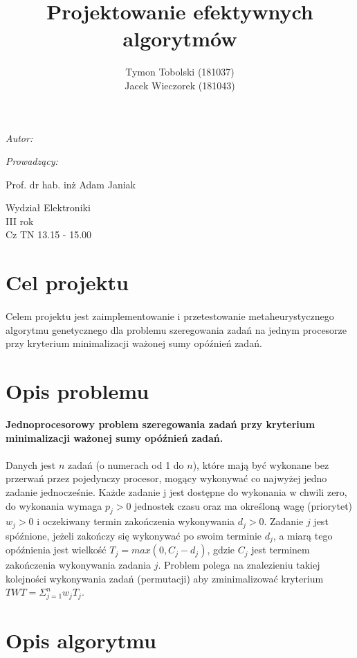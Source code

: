 \documentclass[wide,a4paper,titlepage,12pt] {article}
\title{Projektowanie efektywnych algorytmów}
\author{Tymon Tobolski (181037)\\ Jacek Wieczorek (181043)}
\makeatletter
\renewcommand{\maketitle}{
\begin{titlepage}
  \begin{center}
    \vspace*{3cm}
    \LARGE \@title \par
    \vspace{2cm}
    \textit{\small Autor:}\par
    \normalsize \@author\par \normalsize
    \vspace{3cm}
    \textit{\small Prowadzący:}\par
   Prof. dr hab. inż Adam Janiak \par
    \vspace{2cm}
    Wydział Elektroniki\\ III rok\\ Cz TN 13.15 - 15.00\par
    \vspace{4cm}
    \small \@date
  \end{center}
\end{titlepage}
}
\makeatother
\begin{document}
\maketitle

\section{Cel projektu}
\paragraph{}
  Celem projektu jest zaimplementowanie i przetestowanie metaheurystycznego algorytmu genetycznego dla problemu szeregowania zadań na jednym procesorze przy kryterium minimalizacji ważonej sumy opóźnień zadań.

\section{Opis problemu}
{\bf Jednoprocesorowy problem szeregowania zadań przy kryterium
minimalizacji ważonej sumy opóźnień zadań.}

\paragraph{}
Danych jest $n$ zadań (o numerach od 1 do $n$), które mają być wykonane bez przerwań przez pojedynczy procesor, mogący wykonywać co najwyżej jedno zadanie jednocześnie.
Każde zadanie j jest dostępne do wykonania w chwili zero, do wykonania wymaga $p_{j} > 0$ jednostek czasu oraz ma określoną wagę (priorytet) $w_{j} > 0$ i oczekiwany termin zakończenia
wykonywania $d_{j} > 0$. Zadanie $j$ jest spóźnione, jeżeli zakończy się wykonywać po swoim terminie $d_{j}$, a miarą tego opóźnienia jest wielkość $T_{j} = max(0, C_{j} - d_{j} )$, gdzie $C_{j}$ jest terminem zakończenia
wykonywania zadania $j$. Problem polega na znalezieniu takiej kolejności wykonywania zadań (permutacji) aby zminimalizować kryterium $TWT = \Sigma_{j=1}^{n} w_{j} T_{j}$.

\section{Opis algorytmu}
\paragraph{}


\newpage
\end{document}
